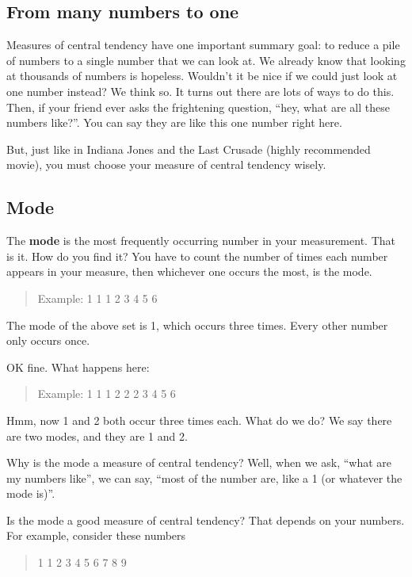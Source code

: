 \documentclass[
]{book}
\begin{document}
\subsection{From many numbers to one}\label{from-many-numbers-to-one}

Measures of central tendency have one important summary goal: to reduce a pile of numbers to a single number that we can look at. We already know that looking at thousands of numbers is hopeless. Wouldn't it be nice if we could just look at one number instead? We think so. It turns out there are lots of ways to do this. Then, if your friend ever asks the frightening question, ``hey, what are all these numbers like?''. You can say they are like this one number right here.

But, just like in Indiana Jones and the Last Crusade (highly recommended movie), you must choose your measure of central tendency wisely.

\subsection{Mode}\label{mode}

The \textbf{mode} is the most frequently occurring number in your measurement. That is it. How do you find it? You have to count the number of times each number appears in your measure, then whichever one occurs the most, is the mode.

\begin{quote}
Example: 1 1 1 2 3 4 5 6
\end{quote}

The mode of the above set is 1, which occurs three times. Every other number only occurs once.

OK fine. What happens here:

\begin{quote}
Example: 1 1 1 2 2 2 3 4 5 6
\end{quote}

Hmm, now 1 and 2 both occur three times each. What do we do? We say there are two modes, and they are 1 and 2.

Why is the mode a measure of central tendency? Well, when we ask, ``what are my numbers like'', we can say, ``most of the number are, like a 1 (or whatever the mode is)''.

Is the mode a good measure of central tendency? That depends on your numbers. For example, consider these numbers

\begin{quote}
1 1 2 3 4 5 6 7 8 9
\end{quote}
\end{document}

